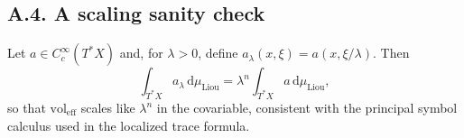 \subsection*{A.4. A scaling sanity check}
Let $a\in C_c^\infty(T^*X)$ and, for $\lambda>0$, define
$a_\lambda(x,\xi)=a(x,\xi/\lambda)$.
Then
\[
  \int_{T^*X} a_\lambda\,\mathrm{d}\mu_{\mathrm{Liou}}
  = \lambda^n \int_{T^*X} a\,\mathrm{d}\mu_{\mathrm{Liou}},
\]
so that $\mathrm{vol}_{\mathrm{eff}}$ scales like $\lambda^n$ in the
covariable, consistent with the principal symbol calculus used in the
localized trace formula.
